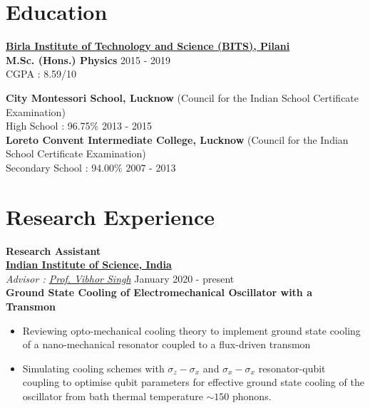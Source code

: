 \documentclass[margin, centered, 11pt]{res}
\begin{document}
\begin{resume}


\section{Education}

\textbf{\href{http://www.bits-pilani.ac.in/}{Birla Institute of Technology and Science (BITS), Pilani}}\\
\textbf{M.Sc. (Hons.) Physics} \hfill 2015 - 2019\\
CGPA : 8.59/10


\textbf{City Montessori School, Lucknow} (Council for the Indian School Certificate Examination)\\ High School : 96.75\% \hfill 2013 - 2015 \\
\textbf{{Loreto Convent Intermediate College, Lucknow}} (Council for the Indian School Certificate Examination)\\
Secondary School : 94.00\% \hfill 2007 - 2013

\section{Research Experience}
\textbf{Research Assistant}
\\
\textbf{\href{https://www.iisc.ac.in/en/}{Indian Institute of Science, India}}\\
\emph{Advisor : \href{https://sites.google.com/view/sqd-lab/home}{Prof. Vibhor Singh} } \hfill January 2020 - present\\
\textbf{Ground State Cooling of Electromechanical Oscillator with a Transmon }
\begin{itemize}[noitemsep, label=\raisebox{0.35ex}{\tiny$\bullet$}]
\item Reviewing opto-mechanical cooling theory to implement ground state cooling of a nano-mechanical resonator coupled to a flux-driven transmon 
\item Simulating cooling schemes with $\sigma_z - \sigma_x$ and $\sigma_x - \sigma_x$ resonator-qubit coupling to optimise qubit parameters for effective ground state cooling of the oscillator from bath thermal temperature $\sim 150$ phonons.
 \end{itemize}


\end{resume}
\end{document}
